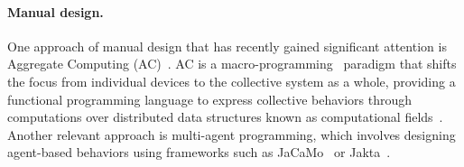 \documentclass[12pt]{article}
\begin{document}
\paragraph{Manual design.}
One approach of manual design that has recently gained significant attention is 
 Aggregate Computing (AC)~\cite{DBLP:journals/computer/BealPV15}. 
% 
AC is a macro-programming~\cite{DBLP:journals/csur/Casadei23} paradigm that shifts the focus from individual 
 devices to the collective system as a whole, providing a functional programming language to express collective 
 behaviors through computations over distributed data structures 
 known as computational fields~\cite{DBLP:journals/pervasive/MameiZL04,DBLP:journals/tocl/AudritoVDPB19}. 
%
Another relevant approach is multi-agent programming, which involves designing agent-based behaviors 
 using frameworks such as JaCaMo~\cite{boissier2020multi} or Jakta~\cite{DBLP:conf/eumas/BaiardiBCP23}.
\end{document}
